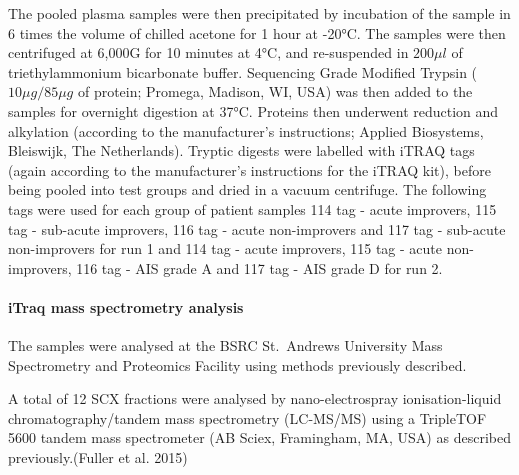 \documentclass[9pt,lineno]{elife}
\begin{document}
The pooled plasma samples were then precipitated by incubation of the sample in 6 times the volume of chilled acetone for 1 hour at -20°C.
The samples were then centrifuged at 6,000G for 10 minutes at 4°C, and re-suspended in \(200\mu l\) of triethylammonium bicarbonate buffer.
Sequencing Grade Modified Trypsin (\(10\mu g/85\mu g\) of protein; Promega, Madison, WI, USA) was then added to the samples for overnight digestion at 37°C.
Proteins then underwent reduction and alkylation (according to the manufacturer's instructions; Applied Biosystems, Bleiswijk, The Netherlands).
Tryptic digests were labelled with iTRAQ tags (again according to the manufacturer's instructions for the iTRAQ kit), before being pooled into test groups and dried in a vacuum centrifuge.
The following tags were used for each group of patient samples 114 tag - acute improvers, 115 tag - sub-acute improvers, 116 tag - acute non-improvers and 117 tag - sub-acute non-improvers for run 1 and 114 tag - acute improvers, 115 tag - acute non-improvers, 116 tag - AIS grade A and 117 tag - AIS grade D for run 2.

\hypertarget{itraq-mass-spectrometry-analysis}{%
\paragraph{iTraq mass spectrometry analysis}\label{itraq-mass-spectrometry-analysis}}

The samples were analysed at the BSRC St.~Andrews University Mass Spectrometry and Proteomics Facility using methods previously described.

A total of 12 SCX fractions were analysed by nano-electrospray ionisation-liquid chromatography/tandem mass spectrometry (LC-MS/MS) using a TripleTOF 5600 tandem mass spectrometer (AB Sciex, Framingham, MA, USA) as described previously.(Fuller et al. 2015)
\end{document}

